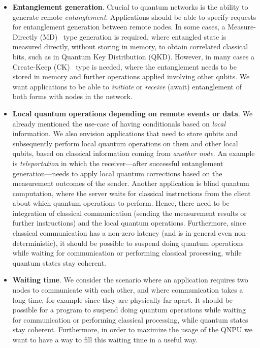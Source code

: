 \begin{itemize}
      \item \textbf{Entanglement generation}.
            Crucial to quantum networks is the ability to generate remote \textit{entanglement}.
            Applications should be able to specify requests for entanglement generation between remote nodes.
            In some cases, a Measure-Directly (MD)~\cite{dahlberg2019linklayer} type generation is required, where entangled state is measured directly, without storing in memory, to obtain correlated classical bits, such as in Quantum Key Distribution (QKD).
            However, in many cases a Create-Keep (CK)~\cite{dahlberg2019linklayer} type is needed, where the entanglement needs to be stored in memory and further operations applied involving other qubits.
            We want applications to be able to \textit{initiate} or \textit{receive} (await) entanglement of both forms with nodes in the network.

      \item \textbf{Local quantum operations depending on remote events or data}.
            We already mentioned the use-case of having conditionals based on \emph{local} information.
            We also envision applications that need to store qubits and subsequently perform local quantum operations on them and other local qubits, based on classical information coming from \textit{another node}.
            An example is \textit{teleportation} in which the receiver---after successful entanglement generation---needs to apply local quantum corrections based on the measurement outcomes of the sender.
            Another application is blind quantum computation, where the server waits for classical instructions from the client about which quantum operations to perform.
            Hence, there need to be integration of classical communication (sending the measurement results or further instructions) and the local quantum operations.
            Furthermore, since classical communication has a non-zero latency (and is in general even non-deterministic), it should be possible to suspend doing quantum operations while waiting for communication or performing classical processing, while quantum states stay coherent.


      \item \textbf{Waiting time}.
            We consider the scenario where an application requires two nodes to communicate with each other, and where communication takes a long time, for example since they are physically far apart.
            It should be possible for a program to suspend doing quantum operations while waiting for communication or performing classical processing, while quantum states stay coherent.
            Furthermore, in order to maximize the usage of the \ac{QNPU} we want to have a way to fill this waiting time in a useful way.
\end{itemize}